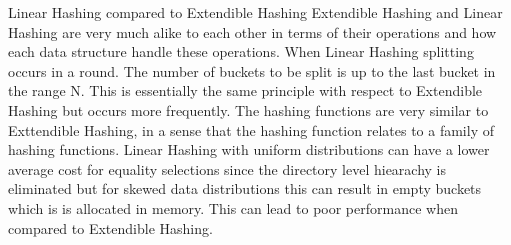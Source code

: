 \documentclass[letterpaper, 12pt]{article}
\begin{document}
Linear Hashing compared to Extendible Hashing
Extendible Hashing and Linear Hashing are very much alike to each other in terms of their operations and how each data structure handle these operations. 
When Linear Hashing splitting occurs in a round. The number of buckets to be split is up to the last bucket in the range N. This is essentially the same principle with
respect to Extendible Hashing but occurs more frequently. The hashing functions are very similar to Exttendible Hashing, in a sense that the hashing function relates to
a family of hashing functions. Linear Hashing with uniform distributions can have a lower average cost for equality selections since the directory level hiearachy is 
eliminated but for skewed data distributions this can result in empty buckets which is is allocated in memory. This can lead to poor performance when compared to
Extendible Hashing. 
\end{document}
